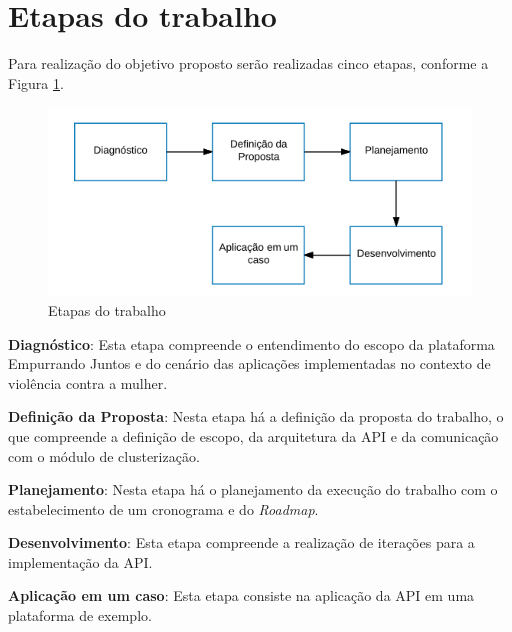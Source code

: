 \section{Etapas do trabalho}

Para realização do objetivo proposto serão realizadas cinco etapas, conforme a Figura \ref{fig:etapas_trabalho}.

\begin{figure}[h!]
\centering
\includegraphics[scale=0.6]{figuras/etapas.png}
\caption{Etapas do trabalho}
\label{fig:etapas_trabalho}
\end{figure}

\noindent \textbf{Diagnóstico}: Esta etapa compreende o entendimento do escopo da plataforma Empurrando Juntos e do cenário das 
aplicações implementadas no contexto de violência contra a mulher.

\noindent \textbf{Definição da Proposta}: Nesta etapa há a definição da proposta do trabalho, o que compreende a definição de escopo, 
da arquitetura da API e da comunicação com o módulo de clusterização.

\noindent \textbf{Planejamento}: Nesta etapa há o planejamento da execução do trabalho com o estabelecimento
de um cronograma e do \textit{Roadmap}.

\noindent \textbf{Desenvolvimento}: Esta etapa compreende a realização de iterações para a implementação da API.

\noindent \textbf{Aplicação em um caso}: Esta etapa consiste na aplicação da API em uma plataforma de exemplo.







